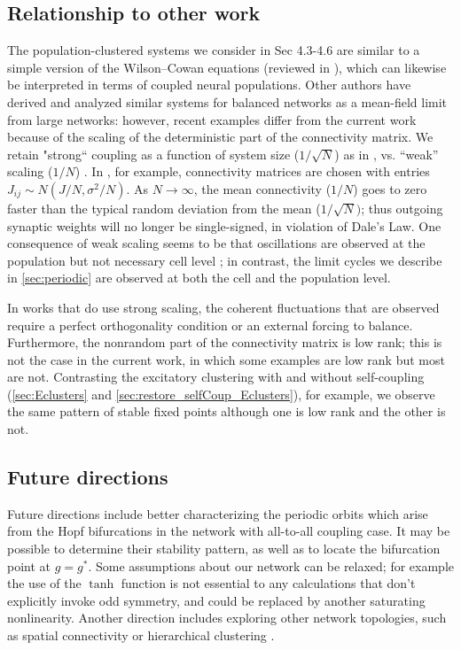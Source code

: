 \documentclass[reqno]{siamonline190516}
\begin{document}
\subsection{Relationship to other work}
The population-clustered systems we consider in Sec 4.3-4.6 are similar to a simple version of the Wilson–Cowan equations (reviewed in \cite{et10,Chow_Y_JNeurophys_2020}), which can likewise be interpreted in terms of coupled neural populations. Other authors have derived and analyzed similar systems for balanced networks as a mean-field limit from large networks: however, recent examples differ from the current work because of the scaling of the deterministic part of the connectivity matrix. We retain "strong“ coupling as a function of system size ($1/\sqrt{N}$) as in \cite{RA06}, vs. “weak” scaling ($1/N$) \cite{hermann_etal_2012,kadmon_HS_2015,Schuessler_etal_PRR_2020}. In \cite{hermann_etal_2012}, for example, connectivity matrices are chosen with entries $J_{ij} \sim N(J/N, \sigma^2/N)$.  As $N \rightarrow \infty$, the mean connectivity ($1/N$) goes to zero faster than the typical random deviation from the mean ($1/\sqrt{N})$; thus  outgoing synaptic weights will no longer be single-signed, in violation of Dale’s Law. One consequence of weak scaling seems to be that oscillations are observed at the population but not necessary cell level \cite{Ginzburg_HS_1994,Brunel_Hakim_1999}; in contrast, the limit cycles we describe in \cref{sec:periodic} are observed at both the cell and the population level.
	
In works that do use strong scaling, the coherent fluctuations that are observed require a perfect orthogonality condition \cite{delMolino_etal_PRE_2013,Landau_HS_PCB_2018} or an external forcing \cite{Landau_HS_PRR_2021} to balance. Furthermore, the nonrandom part of the connectivity matrix is low rank; this is not the case in the current work, in which some examples are low rank but most are not. Contrasting the excitatory clustering with and without self-coupling (\cref{sec:Eclusters} and \cref{sec:restore_selfCoup_Eclusters}), for example, we observe the same pattern of stable fixed points although one is low rank and the other is not.


\subsection{Future directions}

Future directions include better characterizing the periodic orbits which arise from the Hopf bifurcations in the network with all-to-all coupling case. It may be possible to determine their stability pattern, as well as to locate the bifurcation point at $g=g^*$. Some assumptions about our network can be relaxed; for example the use of the $\tanh$ function is not essential to any calculations that don't explicitly invoke odd symmetry, and could be replaced by another saturating nonlinearity. Another direction includes exploring other network topologies, such as spatial connectivity or hierarchical clustering \cite{rosenbaum17,Ebsch_RR_PlosCB_2018}. 
\end{document}

